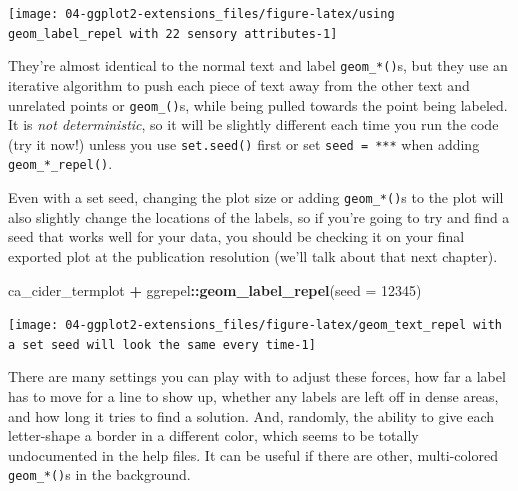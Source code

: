 \documentclass[
]{book}
\newenvironment{Shaded}{\begin{snugshade}}{\end{snugshade}}
\newcommand{\AttributeTok}[1]{\textcolor[rgb]{0.13,0.29,0.53}{#1}}
\newcommand{\DecValTok}[1]{\textcolor[rgb]{0.00,0.00,0.81}{#1}}
\newcommand{\FunctionTok}[1]{\textcolor[rgb]{0.13,0.29,0.53}{\textbf{#1}}}
\newcommand{\NormalTok}[1]{#1}
\newcommand{\SpecialCharTok}[1]{\textcolor[rgb]{0.81,0.36,0.00}{\textbf{#1}}}
\begin{document}
\begin{center}\texttt{[image: 04-ggplot2-extensions\_files/figure-latex/using geom\_label\_repel with 22 sensory attributes-1]} \end{center}

They're almost identical to the normal text and label \texttt{geom\_*()}s, but they use an iterative algorithm to push each piece of text away from the other text and unrelated points or \texttt{geom\_()}s, while being pulled towards the point being labeled. It is \emph{not deterministic}, so it will be slightly different each time you run the code (try it now!) unless you use \texttt{set.seed()} first or set \texttt{seed\ =\ ***} when adding \texttt{geom\_*\_repel()}.

Even with a set seed, changing the plot size or adding \texttt{geom\_*()}s to the plot will also slightly change the locations of the labels, so if you're going to try and find a seed that works well for your data, you should be checking it on your final exported plot at the publication resolution (we'll talk about that next chapter).

\begin{Shaded}
\begin{Highlighting}[]
\NormalTok{ca\_cider\_termplot }\SpecialCharTok{+}
\NormalTok{  ggrepel}\SpecialCharTok{::}\FunctionTok{geom\_label\_repel}\NormalTok{(}\AttributeTok{seed =} \DecValTok{12345}\NormalTok{)}
\end{Highlighting}
\end{Shaded}

\begin{center}\texttt{[image: 04-ggplot2-extensions\_files/figure-latex/geom\_text\_repel with a set seed will look the same every time-1]} \end{center}

There are many settings you can play with to adjust these forces, how far a label has to move for a line to show up, whether any labels are left off in dense areas, and how long it tries to find a solution. And, randomly, the ability to give each letter-shape a border in a different color, which seems to be totally undocumented in the help files. It can be useful if there are other, multi-colored \texttt{geom\_*()}s in the background.
\end{document}
